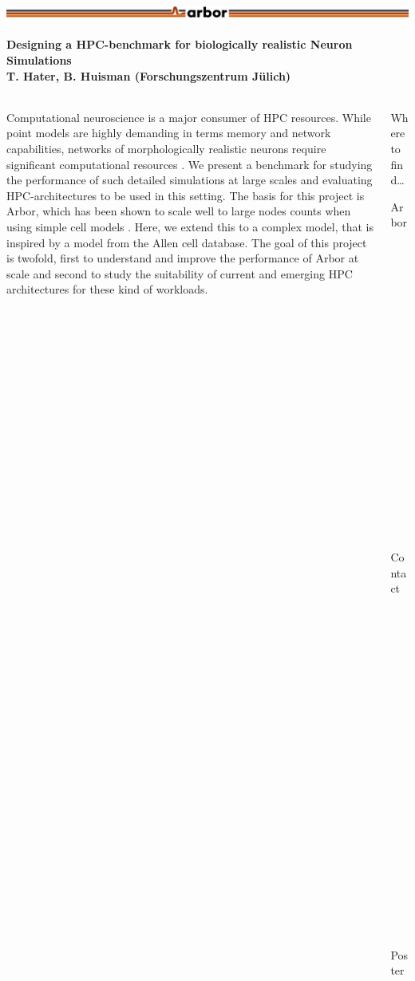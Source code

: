 \documentclass{beamer}
\begin{document}
\newcommand{\nmlcc}{\texttt{nmlcc}}
\newcommand\cpp{C\nolinebreak[4]\hspace{-.05em}\raisebox{.4ex}{\relsize{-3}{\textbf{++}}}}

\begin{frame}[t, fragile]
  \frametitle{\includegraphics[width=0.66\linewidth]{img/arbor-lines-proto-colour-full}}
  \framesubtitle{Designing a HPC-benchmark for biologically realistic Neuron Simulations\\
    \tiny{T. Hater, B. Huisman (Forschungszentrum Jülich)}}
  \begin{columns}[onlytextwidth,T]
    \begin{column}{0.76\textwidth}
      Computational neuroscience is a major consumer of HPC resources. While
      point models are highly demanding in terms memory and network
      capabilities, networks of morphologically realistic neurons require
      significant computational resources \cite{NEST,arb,nrn}. We present a
      benchmark for studying the performance of such detailed simulations at
      large scales and evaluating HPC-architectures to be used in this setting.
      The basis for this project is Arbor, which has been shown to scale well to
      large nodes counts when using simple cell models \cite{arb}. Here, we
      extend this to a complex model, that is inspired by a model from the Allen
      cell database\cite{allen-v1}. The goal of this project is twofold, first
      to understand and improve the performance of Arbor at scale and second to
      study the suitability of current and emerging HPC architectures for these
      kind of workloads.
    \end{column}
    \begin{column}{0.22\textwidth}
      \vspace*{-1ex}
      \begin{block}{Where to find\dots}
        \begin{description}
          \item[Arbor] \href{https://arbor-sim.github.io}{arbor-sim.github.io}
          \item[Contact] \href{t.hater@fz-juelich.de}{t.hater@fz-juelich.de}
          \item[Poster] \href{https://github.com/thorstenhater/isc-2023}{github.com/thorstenhater/isc-2023}
        \end{description}

\end{block}
\end{column}
\end{columns}
\end{frame}
\end{document}
